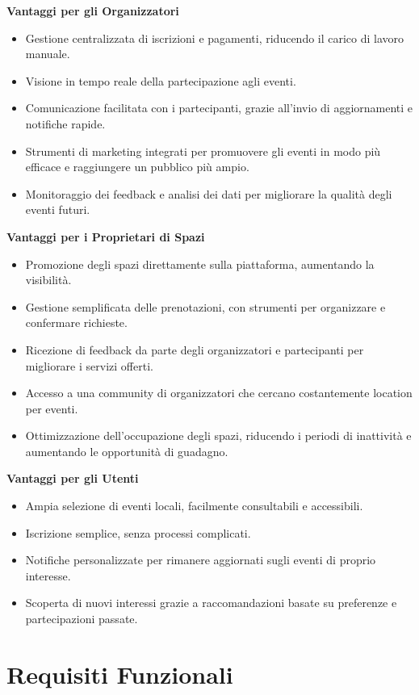 \documentclass[9pt]{extarticle}
\begin{document}
\textbf{Vantaggi per gli Organizzatori}
\begin{itemize}
	\item Gestione centralizzata di iscrizioni e pagamenti, riducendo il carico di lavoro manuale.
	\item Visione in tempo reale della partecipazione agli eventi.
	\item Comunicazione facilitata con i partecipanti, grazie all'invio di aggiornamenti e notifiche rapide.
	\item Strumenti di marketing integrati per promuovere gli eventi in modo più efficace e raggiungere un pubblico più ampio.
	\item Monitoraggio dei feedback e analisi dei dati per migliorare la qualità degli eventi futuri.
\end{itemize}

\textbf{Vantaggi per i Proprietari di Spazi}
\begin{itemize}
	\item Promozione degli spazi direttamente sulla piattaforma, aumentando la visibilità.
	\item Gestione semplificata delle prenotazioni, con strumenti per organizzare e confermare richieste.
	\item Ricezione di feedback da parte degli organizzatori e partecipanti per migliorare i servizi offerti.
	\item Accesso a una community di organizzatori che cercano costantemente location per eventi.
	\item Ottimizzazione dell'occupazione degli spazi, riducendo i periodi di inattività e aumentando le opportunità di guadagno.
\end{itemize}

\textbf{Vantaggi per gli Utenti}
\begin{itemize}
	\item Ampia selezione di eventi locali, facilmente consultabili e accessibili.
	\item Iscrizione semplice, senza processi complicati.
	\item Notifiche personalizzate per rimanere aggiornati sugli eventi di proprio interesse.
	\item Scoperta di nuovi interessi grazie a raccomandazioni basate su preferenze e partecipazioni passate.
\end{itemize}

\section{Requisiti Funzionali}
\end{document}
